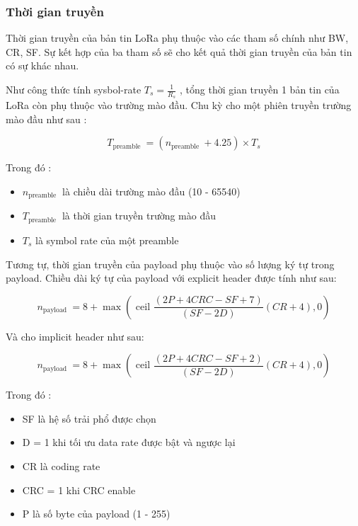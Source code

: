 \documentclass{article} %
\begin{document}
	\subsubsection{Thời gian truyền}
	
	Thời gian truyền của bản tin LoRa phụ thuộc vào các tham số chính như BW, CR, SF. Sự kết hợp của ba tham số sẽ cho kết quả thời gian truyền của bản tin có sự khác nhau.
	
	Như công thức tính sysbol-rate $T_s= \frac{1}{R_s}$ , tổng thời gian truyền 1 bản tin của LoRa còn phụ thuộc vào trường mào đầu. Chu kỳ cho một phiên truyền trường mào đầu như sau\cite{mai2020multi} :
	
	
	\begin{equation}
		T_{\text {preamble }}=\left(n_{\text {preamble }}+4.25\right) \times T_s  
	\end{equation}
	
	Trong đó :
	\begin{itemize}
		\item $n_{\text {preamble }}$ là chiều dài trường mào đầu (10 - 65540)
		\item $T_{\text {preamble }}$ là thời gian truyền trường mào đầu
		\item $T_s$ là symbol rate của một preamble
	\end{itemize}
	
	Tương tự, thời gian truyền của payload phụ thuộc vào số lượng ký tự trong payload. Chiều dài ký tự của payload với explicit header được tính như sau\cite{mai2020multi}:
	
	\begin{equation}
		n_{\text {payload }}=8+\max \left(\text { ceil } \frac{(2 P+4 C R C-S F+7)}{(S F-2 D)}(C R+4), 0\right)
	\end{equation}
	
	Và cho implicit header như sau:
	
	\begin{equation}
		n_{\text {payload }}=8+\max \left(\text { ceil } \frac{(2 P+4 C R C-S F+2)}{(S F-2 D)}(C R+4), 0\right)    
	\end{equation}
	
	
	Trong đó :
	\begin{itemize}
		\item SF là hệ số trải phổ được chọn
		\item D = 1 khi tối ưu data rate được bật và ngược lại
		\item CR là coding rate
		\item CRC = 1 khi CRC enable
		\item P là số byte của payload (1 - 255)
	\end{itemize}
	
\end{document}
